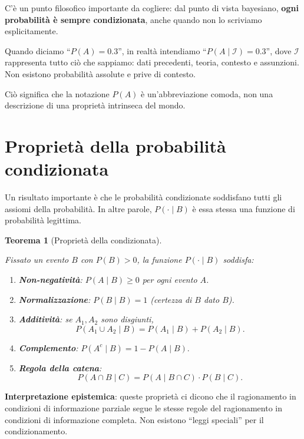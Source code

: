 \documentclass[
  italian,
  letterpaper,
  a4paper,
  11pt,
  open=any]{scrbook}
\theoremstyle{plain}
\newtheorem{theorem}{Teorema}[chapter]
\theoremstyle{definition}
\theoremstyle{definition}
\theoremstyle{remark}
\begin{document}
C'è un punto filosofico importante da cogliere: dal punto di vista
bayesiano, \textbf{ogni probabilità è sempre condizionata}, anche quando
non lo scriviamo esplicitamente.

Quando diciamo ``\(P(A) = 0.3\)'', in realtà intendiamo
``\(P(A \mid \mathcal{I}) = 0.3\)'', dove \(\mathcal{I}\) rappresenta
tutto ciò che sappiamo: dati precedenti, teoria, contesto e assunzioni.
Non esistono probabilità assolute e prive di contesto.

Ciò significa che la notazione \(P(A)\) è un'abbreviazione comoda, non
una descrizione di una proprietà intrinseca del mondo.

\section{Proprietà della probabilità
condizionata}\label{sec-conditional-properties}

Un risultato importante è che le probabilità condizionate soddisfano
tutti gli assiomi della probabilità. In altre parole,
\(P(\cdot \mid B)\) è essa stessa una funzione di probabilità legittima.

\begin{theorem}[Proprietà della
condizionata]\protect\hypertarget{thm-conditional-properties}{}\label{thm-conditional-properties}

Fissato un evento \(B\) con \(P(B) > 0\), la funzione
\(P(\cdot \mid B)\) soddisfa:

\begin{enumerate}
\def\labelenumi{\arabic{enumi}.}
\item
  \textbf{Non-negatività}: \(P(A \mid B) \geq 0\) per ogni evento \(A\).
\item
  \textbf{Normalizzazione}: \(P(B \mid B) = 1\) (certezza di \(B\) dato
  \(B\)).
\item
  \textbf{Additività}: se \(A_1, A_2\) sono disgiunti,
  \[P(A_1 \cup A_2 \mid B) = P(A_1 \mid B) + P(A_2 \mid B).\]
\item
  \textbf{Complemento}: \(P(A^c \mid B) = 1 - P(A \mid B).\)
\item
  \textbf{Regola della catena}:
  \[P(A \cap B \mid C) = P(A \mid B \cap C) \cdot P(B \mid C).\]
\end{enumerate}

\end{theorem}

\textbf{Interpretazione epistemica}: queste proprietà ci dicono che il
ragionamento in condizioni di informazione parziale segue le stesse
regole del ragionamento in condizioni di informazione completa. Non
esistono ``leggi speciali'' per il condizionamento.
\end{document}
